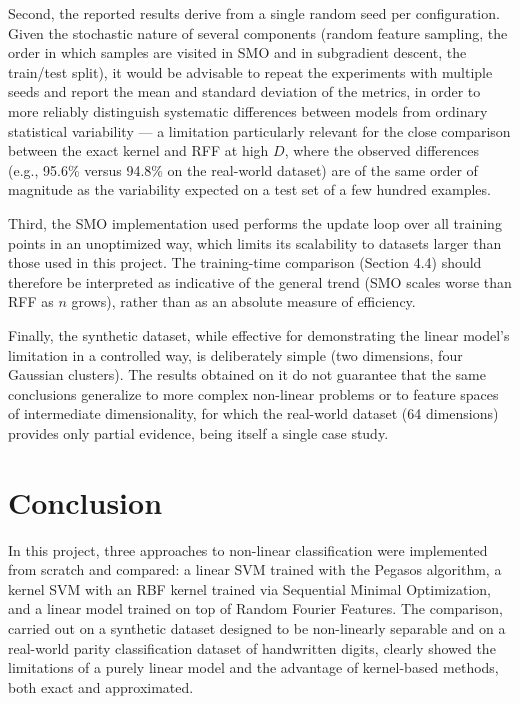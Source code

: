 \documentclass{article}
\begin{document}
Second, the reported results derive from a single random seed per configuration. Given the stochastic nature of several components (random feature sampling, the order in which samples are visited in SMO and in subgradient descent, the train/test split), it would be advisable to repeat the experiments with multiple seeds and report the mean and standard deviation of the metrics, in order to more reliably distinguish systematic differences between models from ordinary statistical variability — a limitation particularly relevant for the close comparison between the exact kernel and RFF at high $D$, where the observed differences (e.g., 95.6\% versus 94.8\% on the real-world dataset) are of the same order of magnitude as the variability expected on a test set of a few hundred examples.

Third, the SMO implementation used performs the update loop over all training points in an unoptimized way, which limits its scalability to datasets larger than those used in this project. The training-time comparison (Section 4.4) should therefore be interpreted as indicative of the general trend (SMO scales worse than RFF as $n$ grows), rather than as an absolute measure of efficiency.

Finally, the synthetic dataset, while effective for demonstrating the linear model's limitation in a controlled way, is deliberately simple (two dimensions, four Gaussian clusters). The results obtained on it do not guarantee that the same conclusions generalize to more complex non-linear problems or to feature spaces of intermediate dimensionality, for which the real-world dataset (64 dimensions) provides only partial evidence, being itself a single case study.

\section{Conclusion}

In this project, three approaches to non-linear classification were implemented from scratch and compared: a linear SVM trained with the Pegasos algorithm, a kernel SVM with an RBF kernel trained via Sequential Minimal Optimization, and a linear model trained on top of Random Fourier Features. The comparison, carried out on a synthetic dataset designed to be non-linearly separable and on a real-world parity classification dataset of handwritten digits, clearly showed the limitations of a purely linear model and the advantage of kernel-based methods, both exact and approximated.
\end{document}
